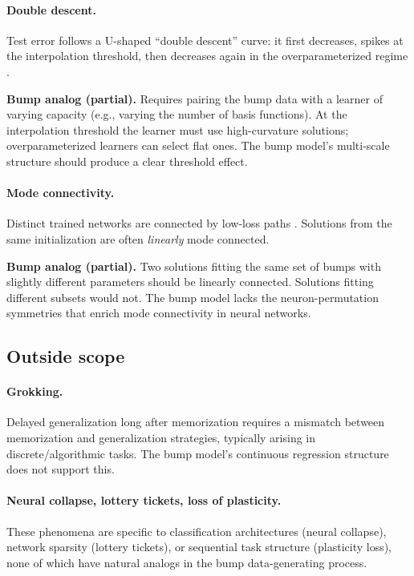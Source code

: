 \documentclass{article}
\begin{document}
\paragraph{Double descent.}
Test error follows a U-shaped ``double descent'' curve: it first
decreases, spikes at the interpolation threshold, then decreases again
in the overparameterized regime
\cite{belkin2019reconciling,nakkiran2020deep}.

\textbf{Bump analog (partial).} Requires pairing the bump data with a
learner of varying capacity (e.g., varying the number of basis functions).
At the interpolation threshold the learner must use high-curvature
solutions; overparameterized learners can select flat ones. The bump
model's multi-scale structure should produce a clear threshold effect.

\paragraph{Mode connectivity.}
Distinct trained networks are connected by low-loss paths
\cite{draxler2018essentially}. Solutions from the same initialization
are often \emph{linearly} mode connected.

\textbf{Bump analog (partial).} Two solutions fitting the same set of
bumps with slightly different parameters should be linearly connected.
Solutions fitting different subsets would not. The bump model lacks the
neuron-permutation symmetries that enrich mode connectivity in neural
networks.

\subsection{Outside scope}\label{sec:outside}

\paragraph{Grokking.} Delayed generalization long after memorization
\cite{power2022grokking} requires a mismatch between memorization and
generalization strategies, typically arising in discrete/algorithmic tasks.
The bump model's continuous regression structure does not support this.

\paragraph{Neural collapse, lottery tickets, loss of plasticity.}
These phenomena are specific to classification architectures (neural
collapse), network sparsity (lottery tickets), or sequential task
structure (plasticity loss), none of which have natural analogs in the
bump data-generating process.
\end{document}
